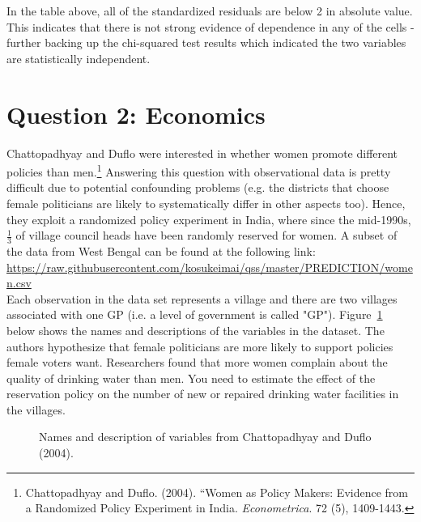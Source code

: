 \documentclass[12pt,letterpaper]{article}
\begin{document}
\begin{enumerate}
	 In the table above, all of the standardized residuals are below 2 in absolute value. This indicates that there is not strong evidence of dependence in any of the cells - further backing up the chi-squared test results which indicated the two variables are statistically independent.
\end{enumerate}
\newpage

\section*{Question 2: Economics}
Chattopadhyay and Duflo were interested in whether women promote different policies than men.\footnote{Chattopadhyay and Duflo. (2004). ``Women as Policy Makers: Evidence from a Randomized Policy Experiment in India. \textit{Econometrica}. 72 (5), 1409-1443.} Answering this question with observational data is pretty difficult due to potential confounding problems (e.g. the districts that choose female politicians are likely to systematically differ in other aspects too). Hence, they exploit a randomized policy experiment in India, where since the mid-1990s, $\frac{1}{3}$ of village council heads have been randomly reserved for women. A subset of the data from West Bengal can be found at the following link: \url{https://raw.githubusercontent.com/kosukeimai/qss/master/PREDICTION/women.csv}\\

\noindent Each observation in the data set represents a village and there are two villages associated with one GP (i.e. a level of government is called "GP"). Figure~\ref{fig:women_desc} below shows the names and descriptions of the variables in the dataset. The authors hypothesize that female politicians are more likely to support policies female voters want. Researchers found that more women complain about the quality of drinking water than men. You need to estimate the effect of the reservation policy on the number of new or repaired drinking water facilities in the villages.
\vspace{.5cm}
\begin{figure}[h!]
	\caption{\footnotesize{Names and description of variables from Chattopadhyay and Duflo (2004).}}
	\vspace{.5cm}
	\centering
	\label{fig:women_desc}
\end{figure}		
\end{document}
